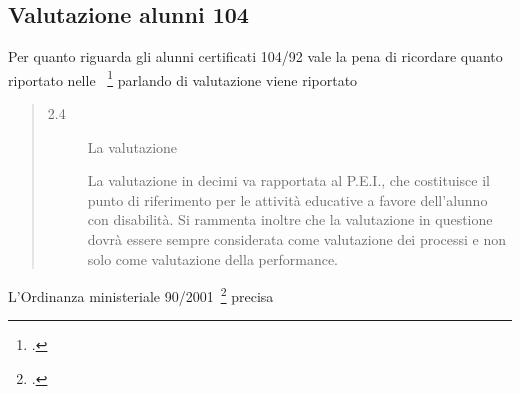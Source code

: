 \subsection{Valutazione alunni 104}
Per quanto riguarda gli alunni certificati 104/92 vale la pena di ricordare quanto riportato nelle ~\footcite{LineGuida2009}
parlando di valutazione viene riportato
\begin{quote}
	\begin{description}
		\item[2.4] La valutazione
		
		La valutazione in decimi va rapportata al P.E.I., che costituisce il punto di riferimento per le attività educative a favore dell'alunno con disabilità. Si rammenta
		inoltre che la valutazione in questione dovrà essere sempre considerata come valutazione dei processi e non solo come valutazione della performance.
	\end{description}
\end{quote}
L'Ordinanza ministeriale 90/2001~\footcite{OM_90_2001} precisa 

